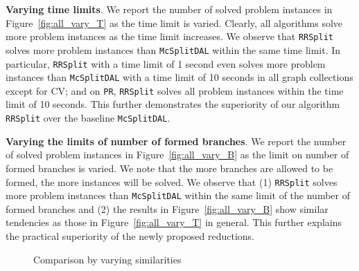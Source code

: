 \smallskip
\noindent\textbf{Varying time limits}. We report the number of solved problem instances in Figure~\ref{fig:all_vary_T} as the time limit is varied. Clearly, all algorithms solve more problem instances as the time limit increases. We observe that \texttt{RRSplit} solves more problem instances than \texttt{McSplitDAL} within the same time limit. In particular, \texttt{RRSplit} with a time limit of 1 second even solves more problem instances than \texttt{McSplitDAL} with a time limit of 10 seconds in all graph collections {\cheng except for} \textsf{CV}; and on \texttt{PR}, \texttt{RRSplit} solves all problem instances within the time limit of 10 seconds. This further demonstrates the superiority of our algorithm \texttt{RRSplit} over the baseline \texttt{McSplitDAL}. 

\smallskip
\noindent\textbf{Varying the limits of number of formed branches}. We report the number of solved problem instances in Figure~\ref{fig:all_vary_B} as the limit on  number of formed branches is varied. We note that the more branches are allowed to be formed, the more instances will be solved. We observe that (1) \texttt{RRSplit} solves more problem instances than \texttt{McSplitDAL} within the same limit of the number of formed branches and (2) the results in Figure~\ref{fig:all_vary_B} show  similar tendencies as those in Figure~\ref{fig:all_vary_T} in general. This further {\cheng explains} the practical superiority of the newly proposed reductions.


\begin{figure}[]
        \vspace{-0.2in}
	\caption{Comparison by varying similarities}
	\label{fig:all_vary_S}
\end{figure}

